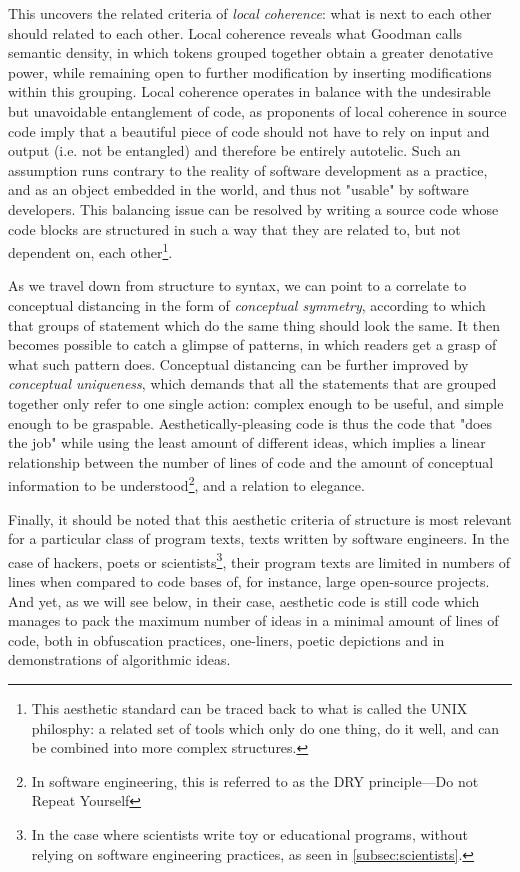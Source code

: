This uncovers the related criteria of \emph{local coherence}: what is next to each other should related to each other. Local coherence reveals what Goodman calls semantic density, in which tokens grouped together obtain a greater denotative power, while remaining open to further modification by inserting modifications within this grouping. Local coherence operates in balance with the undesirable but unavoidable entanglement of code, as proponents of local coherence in source code imply that a beautiful piece of code should not have to rely on input and output (i.e. not be entangled) and therefore be entirely autotelic. Such an assumption runs contrary to the reality of software development as a practice, and as an object embedded in the world, and thus not "usable" by software developers. This balancing issue can be resolved by writing a source code whose code blocks are structured in such a way that they are related to, but not dependent on, each other\footnote{This aesthetic standard can be traced back to what is called the UNIX philosphy: a related set of tools which only do one thing, do it well, and can be combined into more complex structures.}.

As we travel down from structure to syntax, we can point to a correlate to conceptual distancing in the form of \emph{conceptual symmetry}, according to which that groups of statement which do the same thing should look the same. It then becomes possible to catch a glimpse of patterns, in which readers get a grasp of what such pattern does. Conceptual distancing can be further improved by \emph{conceptual uniqueness}, which demands that all the statements that are grouped together only refer to one single action: complex enough to be useful, and simple enough to be graspable. Aesthetically-pleasing code is thus the code that "does the job" while using the least amount of different ideas, which implies a linear relationship between the number of lines of code and the amount of conceptual information to be understood\footnote{In software engineering, this is referred to as the DRY principle—Do not Repeat Yourself\citep{martin_clean_2008}}, and a relation to elegance.

Finally, it should be noted that this aesthetic criteria of structure is most relevant for a particular class of program texts, texts written by software engineers. In the case of hackers, poets or scientists\footnote{In the case where scientists write toy or educational programs, without relying on software engineering practices, as seen in \autoref{subsec:scientists}.}, their program texts are limited in numbers of lines when compared to code bases of, for instance, large open-source projects. And yet, as we will see below, in their case, aesthetic code is still code which manages to pack the maximum number of ideas in a minimal amount of lines of code, both in obfuscation practices, one-liners, poetic depictions and in demonstrations of algorithmic ideas.

